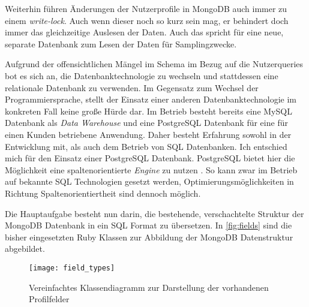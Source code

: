 Weiterhin führen Änderungen der Nutzerprofile in MongoDB auch immer zu einem \textit{write-lock}. Auch wenn dieser noch so kurz sein mag, er behindert doch immer das gleichzeitige Auslesen der Daten. Auch das spricht für eine neue, separate Datenbank zum Lesen der Daten für Samplingzwecke.

Aufgrund der offensichtlichen Mängel im Schema im Bezug auf die Nutzerqueries bot es sich an, die Datenbanktechnologie zu wechseln und stattdessen eine relationale Datenbank zu verwenden. Im Gegensatz zum Wechsel der Programmiersprache, stellt der Einsatz einer anderen Datenbanktechnologie im konkreten Fall keine große Hürde dar. Im Betrieb besteht bereits eine MySQL \cite{mysql} Datenbank als \textit{Data Warehouse} und eine PostgreSQL \cite{postgres} Datenbank für eine für einen Kunden betriebene Anwendung. Daher besteht Erfahrung sowohl in der Entwicklung mit, als auch dem Betrieb von SQL Datenbanken.
Ich entschied mich für den Einsatz einer PostgreSQL Datenbank. PostgreSQL bietet hier die Möglichkeit eine spaltenorientierte \textit{Engine} zu nutzen \cite{postgres:column}. So kann zwar im Betrieb auf bekannte SQL Technologien gesetzt werden, Optimierungsmöglichkeiten in Richtung Spaltenorientiertheit sind dennoch möglich.

Die Hauptaufgabe besteht nun darin, die bestehende, verschachtelte Struktur der MongoDB Datenbank in ein SQL Format zu übersetzen.
In \autoref{fig:fields} sind die bisher eingesetzten Ruby Klassen zur Abbildung der MongoDB Datenstruktur abgebildet. 

\begin{figure}[!ht]
    \centering
    \caption{Vereinfachtes Klassendiagramm zur Darstellung der vorhandenen Profilfelder}
    \label{fig:fields}
    \texttt{[image: field\_types]}
\end{figure}

